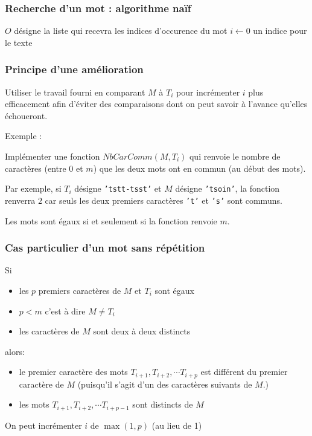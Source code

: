 \begin{frame}
\frametitle{Recherche d'un mot : algorithme naïf}
\begin{algorithm}[H]
  $O$ désigne la liste qui recevra les indices d'occurence du mot\;
  $i\leftarrow 0$ un indice pour le texte \;
  \caption{}
\end{algorithm}
\end{frame}

\begin{frame}
  \frametitle{Principe d'une amélioration}
\begin{center}
  \item Utiliser le travail fourni en comparant $M$ à $T_i$ pour incrémenter $i$ plus efficacement afin d'éviter des comparaisons dont on peut savoir à l'avance qu'elles échoueront. 
\end{center}

Exemple :

Implémenter une fonction $NbCarComm(M,T_i)$ qui renvoie le nombre de caractères (entre 0 et $m$) que les deux mots ont en commun (au début des mots).

Par exemple, si $T_i$ désigne \texttt{'tstt-tsst'} et $M$ désigne \texttt{'tsoin'}, la fonction renverra $2$ car seuls les deux premiers caractères \texttt{'t'} et \texttt{'s'} sont communs.

Les mots sont égaux si et seulement si la fonction renvoie $m$.
\end{frame}

\begin{frame}
  \frametitle{Cas particulier d'un mot sans répétition}
Si
\begin{itemize}
  \item les $p$ premiers caractères de $M$ et $T_i$ sont égaux
  \item $p<m$ c'est à dire $M\neq T_i$
  \item les caractères de $M$ sont deux à deux distincts
\end{itemize}
alors:
\begin{itemize}
  \item le premier caractère des mots $T_{i+1}, T_{i+2},\cdots T_{i+p}$ est différent du premier caractère de $M$ (puisqu'il s'agit d'un des caractères suivants de $M$.)
  \item les mots $T_{i+1}, T_{i+2},\cdots T_{i+p-1}$ sont distincts de $M$
\end{itemize}
On peut incrémenter $i$ de $\max(1,p)$ (au lieu de 1)
\end{frame}

